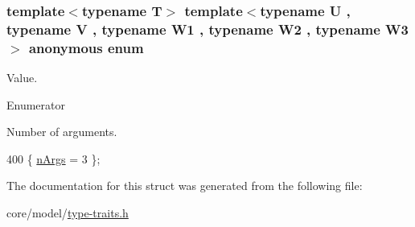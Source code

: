 \subsubsection[{\texorpdfstring{anonymous enum}{anonymous enum}}]{\setlength{\rightskip}{0pt plus 5cm}template$<$typename T$>$ template$<$typename U , typename V , typename W1 , typename W2 , typename W3 $>$ anonymous enum}\hypertarget{structTypeTraits_1_1PtrToMemberTraits_3_01U_07V_1_1_5_08_07W1_00_01W2_00_01W3_08_4_a562b75622d0cb79a614921b280450185}{}\label{structTypeTraits_1_1PtrToMemberTraits_3_01U_07V_1_1_5_08_07W1_00_01W2_00_01W3_08_4_a562b75622d0cb79a614921b280450185}
Value. \begin{Desc}
\item[Enumerator]\par
\begin{description}
\item[{\em 
n\+Args\hypertarget{structTypeTraits_1_1PtrToMemberTraits_3_01U_07V_1_1_5_08_07W1_00_01W2_00_01W3_08_4_a562b75622d0cb79a614921b280450185a86029240032d4ea1a4e036d833af1db3}{}\label{structTypeTraits_1_1PtrToMemberTraits_3_01U_07V_1_1_5_08_07W1_00_01W2_00_01W3_08_4_a562b75622d0cb79a614921b280450185a86029240032d4ea1a4e036d833af1db3}
}]Number of arguments. \end{description}
\end{Desc}

\begin{DoxyCode}
400 \{ \hyperlink{structTypeTraits_1_1PtrToMemberTraits_3_01U_07V_1_1_5_08_07W1_00_01W2_00_01W3_08_4_a562b75622d0cb79a614921b280450185a86029240032d4ea1a4e036d833af1db3}{nArgs} = 3                \};
\end{DoxyCode}


The documentation for this struct was generated from the following file\+:\begin{DoxyCompactItemize}
\item 
core/model/\hyperlink{type-traits_8h}{type-\/traits.\+h}\end{DoxyCompactItemize}
